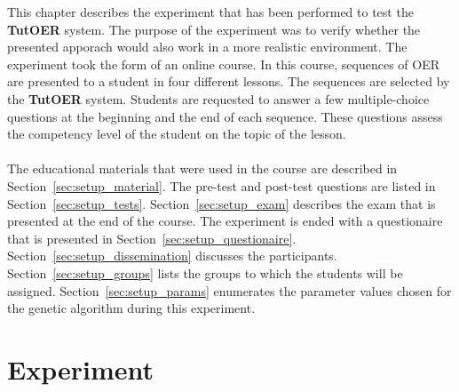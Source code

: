 This chapter describes the experiment that has been performed to test the
\textbf{TutOER} system. The purpose of the experiment was to verify whether the
presented apporach would also work in a more realistic environment. The
experiment took the form of an online course. In this course, sequences of OER
are presented to a student in four different lessons. The sequences are
selected by the \textbf{TutOER} system. Students are requested to answer a few
multiple-choice questions at the beginning and the end of each sequence. These
questions assess the competency level of the student on the topic of the
lesson.\\\\
\noindent
The educational materials that were used in the course are described in
Section~\ref{sec:setup_material}. The pre-test and post-test questions are
listed in Section~\ref{sec:setup_tests}. Section~\ref{sec:setup_exam} describes
the exam that is presented at the end of the course. The experiment is ended
with a questionaire that is presented in Section~\ref{sec:setup_questionaire}.
Section~\ref{sec:setup_dissemination} discusses the participants.
Section~\ref{sec:setup_groups} lists the groups to which the students will be
assigned. Section~\ref{sec:setup_params} enumerates the parameter values chosen
for the genetic algorithm during this experiment.
\section{Experiment}
